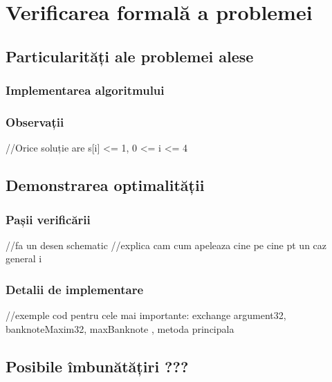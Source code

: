\chapter{Verificarea formală a problemei}


\section{Particularități ale problemei alese}
    \subsection{Implementarea algoritmului}
    \subsection{Observații}
    //Orice soluție are s[i] <= 1, 0 <= i <= 4

\section{Demonstrarea optimalității}
    \subsection{Pașii verificării}
    //fa un desen schematic
    //explica cam cum apeleaza cine pe cine pt un caz general i 
    \subsection{Detalii de implementare}
    //exemple cod pentru cele mai importante: exchange argument32, banknoteMaxim32, maxBanknote , metoda principala

\section{Posibile îmbunătățiri ???}



